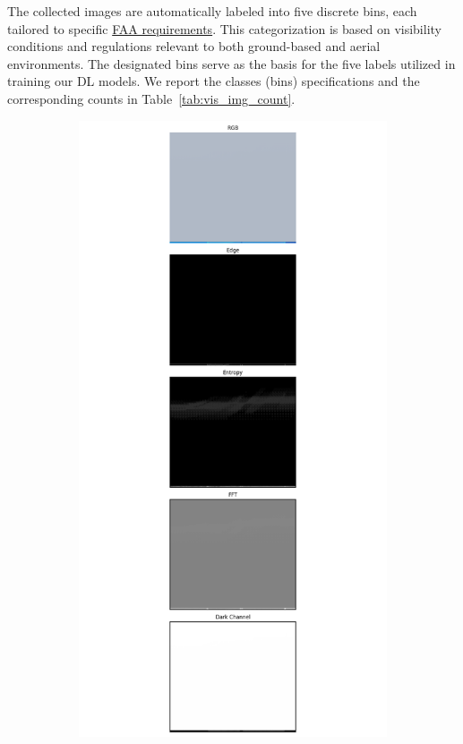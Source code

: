 The collected images are automatically labeled into five discrete bins, each tailored to specific \href{https://www.faa.gov/air_traffic/publications/atpubs/aim_html/}{FAA requirements}. This categorization is based on visibility conditions and regulations relevant to both ground-based and aerial environments. The designated bins serve as the basis for the five labels utilized in training our DL models. 
We report the classes (bins) specifications and the corresponding counts in Table~\ref{tab:vis_img_count}.


\begin{figure}
  \centering
  \begin{subfigure}[b]{0.15\textwidth}
    \includegraphics[width=\textwidth, trim={7.5cm 0cm 7.5cm 0cm},clip]{imgs/examples/exp_0_featuresMiles_0.12427454732996136_featuresM_200_features.png}

\end{subfigure}
\end{figure}
